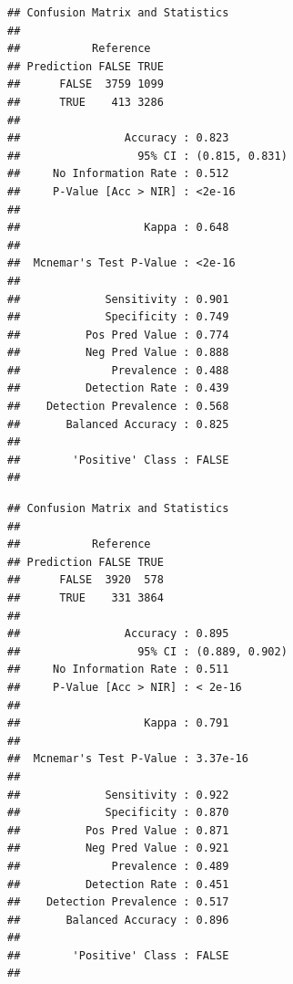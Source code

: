 \documentclass[
]{article}
\newenvironment{Shaded}{\begin{snugshade}}{\end{snugshade}}
\newcommand{\CommentTok}[1]{\textcolor[rgb]{0.56,0.35,0.01}{\textit{#1}}}
\newcommand{\DocumentationTok}[1]{\textcolor[rgb]{0.56,0.35,0.01}{\textbf{\textit{#1}}}}
\newcommand{\FunctionTok}[1]{\textcolor[rgb]{0.00,0.00,0.00}{#1}}
\newcommand{\NormalTok}[1]{#1}
\newcommand{\SpecialCharTok}[1]{\textcolor[rgb]{0.00,0.00,0.00}{#1}}
\begin{document}
\begin{Shaded}
\end{Shaded}

\begin{verbatim}
## Confusion Matrix and Statistics
## 
##           Reference
## Prediction FALSE TRUE
##      FALSE  3759 1099
##      TRUE    413 3286
##                                         
##                Accuracy : 0.823         
##                  95% CI : (0.815, 0.831)
##     No Information Rate : 0.512         
##     P-Value [Acc > NIR] : <2e-16        
##                                         
##                   Kappa : 0.648         
##                                         
##  Mcnemar's Test P-Value : <2e-16        
##                                         
##             Sensitivity : 0.901         
##             Specificity : 0.749         
##          Pos Pred Value : 0.774         
##          Neg Pred Value : 0.888         
##              Prevalence : 0.488         
##          Detection Rate : 0.439         
##    Detection Prevalence : 0.568         
##       Balanced Accuracy : 0.825         
##                                         
##        'Positive' Class : FALSE         
## 
\end{verbatim}

\begin{Shaded}
\end{Shaded}

\begin{verbatim}
## Confusion Matrix and Statistics
## 
##           Reference
## Prediction FALSE TRUE
##      FALSE  3920  578
##      TRUE    331 3864
##                                         
##                Accuracy : 0.895         
##                  95% CI : (0.889, 0.902)
##     No Information Rate : 0.511         
##     P-Value [Acc > NIR] : < 2e-16       
##                                         
##                   Kappa : 0.791         
##                                         
##  Mcnemar's Test P-Value : 3.37e-16      
##                                         
##             Sensitivity : 0.922         
##             Specificity : 0.870         
##          Pos Pred Value : 0.871         
##          Neg Pred Value : 0.921         
##              Prevalence : 0.489         
##          Detection Rate : 0.451         
##    Detection Prevalence : 0.517         
##       Balanced Accuracy : 0.896         
##                                         
##        'Positive' Class : FALSE         
## 
\end{verbatim}
\end{document}
